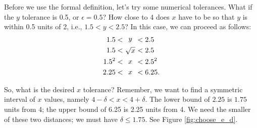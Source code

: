 \begin{solution}
{Before we use the formal definition, let's try some numerical tolerances.  What if the $y$ tolerance is 0.5, or $\epsilon =0.5$?  How close to 4 does $x$ have to be so that $y$ is within 0.5 units of 2, i.e., $1.5 < y < 2.5$?  In this case, we can proceed as follows:
\begin{align*}
1.5 &< \parbox{15pt}{\centering $y$} < 2.5 \\
1.5 &< \parbox{15pt}{\centering $\sqrt{x}$} < 2.5\\
1.5^2 &< \parbox{15pt}{\centering $x$} < 2.5^2\\
2.25 &< \parbox{15pt}{\centering $x$} < 6.25.
\end{align*}

So, what is the desired $x$ tolerance?  Remember, we want to find a symmetric interval of $x$ values, namely
$4 - \delta < x < 4 + \delta$.  The lower bound of $2.25$ is $1.75$ units from 4; the upper bound of 6.25 is 2.25 units from 4. We need the smaller of these two distances; we must have $\delta \leq 1.75$. See Figure \ref{fig:choose_e_d}.\\


}
\end{solution}
